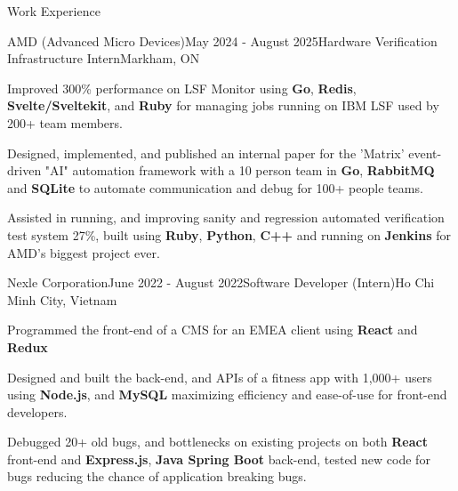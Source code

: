 \documentclass[
	11pt, %
]{resume} %
\begin{document}


\begin{rSection}{Work Experience}
	\begin{rSubsection}{AMD (Advanced Micro Devices)}{May 2024 - August 2025}{Hardware Verification Infrastructure Intern}{Markham, ON}
	\item Improved 300\% performance on LSF Monitor using \textbf{Go}, \textbf{Redis}, \textbf{Svelte/Sveltekit}, and \textbf{Ruby} for managing jobs running on IBM LSF used by 200+ team members.
	\item Designed, implemented, and published an internal paper for the 'Matrix' event-driven "AI" automation framework with a 10 person team in \textbf{Go}, \textbf{RabbitMQ} and \textbf{SQLite} to automate communication and debug for 100+ people teams.
	\item Assisted in running, and improving sanity and regression automated verification test system 27\%, built using \textbf{Ruby}, \textbf{Python}, \textbf{C++} and running on \textbf{Jenkins} for AMD's biggest project ever.
	\end{rSubsection}
	\begin{rSubsection}{Nexle Corporation}{June 2022 - August 2022}{Software Developer (Intern)}{Ho Chi Minh City, Vietnam}
		\item Programmed the front-end of a CMS for an EMEA client using \textbf{React} and \textbf{Redux}
		\item Designed and built the back-end, and APIs of a fitness app with 1,000+ users using \textbf{Node.js}, and \textbf{MySQL} maximizing efficiency and ease-of-use for front-end developers.
		\item Debugged 20+ old bugs, and bottlenecks on existing projects on both \textbf{React} front-end and \textbf{Express.js}, \textbf{Java Spring Boot} back-end, tested new code for bugs reducing the chance of application breaking bugs.
	\end{rSubsection}


\end{rSection}
\end{document}
